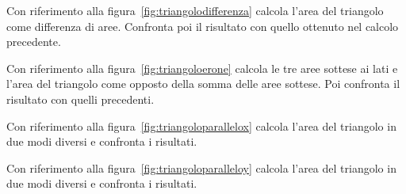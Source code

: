  \begin{esempio}
  Con riferimento alla figura~\ref{fig:triangolodifferenza} calcola 
  l'area del triangolo come differenza di aree.
  Confronta poi il risultato con quello ottenuto nel calcolo precedente.
 \end{esempio}

 \begin{esempio}
  Con riferimento alla figura~\ref{fig:triangoloerone} calcola le tre aree 
  sottese ai lati e l'area del triangolo come opposto della somma delle aree 
  sottese.
  Poi confronta il risultato con quelli precedenti.
 \end{esempio}

 \begin{esempio}
  Con riferimento alla figura~\ref{fig:triangoloparallelox} calcola 
  l'area del triangolo in due modi diversi e confronta i risultati.
 \end{esempio}

 \begin{esempio}
  Con riferimento alla figura~\ref{fig:triangoloparalleloy} calcola 
  l'area del triangolo in due modi diversi e confronta i risultati.
 \end{esempio}

% 
